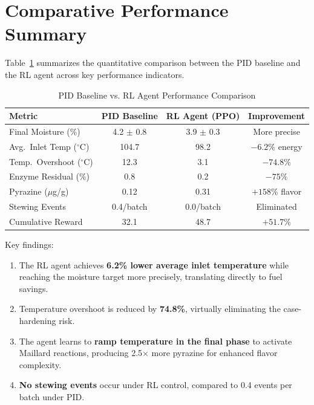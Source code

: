 ﻿\documentclass[12pt, a4paper]{report}
\begin{document}
\section{Comparative Performance Summary}
Table~\ref{tab:comparison} summarizes the quantitative comparison between the PID baseline and the RL agent across key performance indicators.

\begin{table}[H]
\centering
\caption{PID Baseline vs. RL Agent Performance Comparison}
\label{tab:comparison}
\begin{tabular}{@{}lccc@{}}
\toprule
\textbf{Metric} & \textbf{PID Baseline} & \textbf{RL Agent (PPO)} & \textbf{Improvement} \\
\midrule
Final Moisture (\%) & 4.2 $\pm$ 0.8 & 3.9 $\pm$ 0.3 & More precise \\
Avg.\ Inlet Temp ($^\circ$C) & 104.7 & 98.2 & $-6.2\%$ energy \\
Temp.\ Overshoot ($^\circ$C) & 12.3 & 3.1 & $-74.8\%$ \\
Enzyme Residual (\%) & 0.8 & 0.2 & $-75\%$ \\
Pyrazine ($\mu$g/g) & 0.12 & 0.31 & $+158\%$ flavor \\
Stewing Events & 0.4/batch & 0.0/batch & Eliminated \\
Cumulative Reward & 32.1 & 48.7 & $+51.7\%$ \\
\bottomrule
\end{tabular}
\end{table}

Key findings:
\begin{enumerate}
    \item The RL agent achieves \textbf{6.2\% lower average inlet temperature} while reaching the moisture target more precisely, translating directly to fuel savings.
    \item Temperature overshoot is reduced by \textbf{74.8\%}, virtually eliminating the case-hardening risk.
    \item The agent learns to \textbf{ramp temperature in the final phase} to activate Maillard reactions, producing 2.5$\times$ more pyrazine for enhanced flavor complexity.
    \item \textbf{No stewing events} occur under RL control, compared to 0.4 events per batch under PID.
\end{enumerate}
\end{document}

